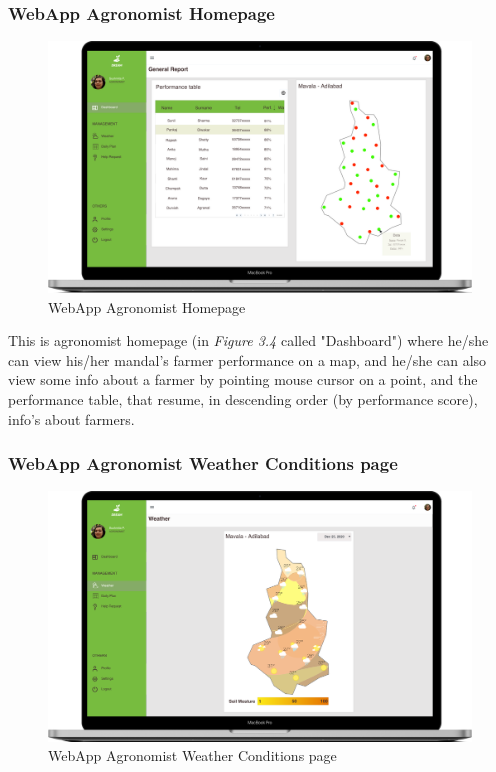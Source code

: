 \subsubsection{WebApp Agronomist Homepage}

\begin{figure}[H]
  \centering
  \centerline{\includegraphics[width=140mm,scale=0.9]{./Images//Mocks/WebApp/Agronomist_Home.png}}
  \caption{WebApp Agronomist Homepage}
\end{figure}

This is agronomist homepage (in \textit{Figure 3.4} called "Dashboard") where he/she can view his/her mandal's farmer performance on a map, and he/she can also view some info about a farmer by pointing mouse cursor on a point, and the performance table, that resume, in descending order (by performance score), info's about farmers.

\subsubsection{WebApp Agronomist Weather Conditions page}

\begin{figure}[H]
  \centering
  \centerline{\includegraphics[width=140mm,scale=0.9]{./Images//Mocks/WebApp/Agronomist_Weather.png}}
  \caption{WebApp Agronomist Weather Conditions page}
\end{figure}

